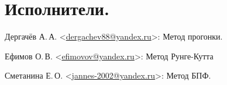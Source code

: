 \section{Исполнители.}
\label{sec:authors}

Дергачёв А.\,А. <\href{mailto:dergachev88@yandex.ru}{dergachev88@yandex.ru}>:
Метод прогонки. \par
Ефимов О.\,В. <\href{mailto:efimovov@yandex.ru}{efimovov@yandex.ru}>:
Метод Рунге-Кутта \par
Сметанина Е.\,О. <\href{mailto:jannes-2002@yandex.ru}{jannes-2002@yandex.ru}>:
Метод БПФ.